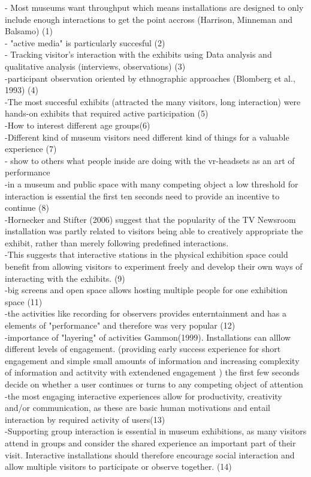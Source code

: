 \documentclass{article}
\begin{document}
- Most museums want throughput which means installations are designed to only include enough interactions to get the point accross
(Harrison, Minneman and Balsamo) (1)
\\
- "active media" is particularly succesful (2)
\\
- Tracking visitor's interaction with the exhibits using Data analysis and qualitative analysis (interviews, observations) (3)
\\
-participant observation oriented by ethnographic approaches (Blomberg et al., 1993) (4)
\\
-The most succesful exhibits (attracted the many visitors, long interaction) were hands-on exhibits that required active
participation (5)
\\
-How to interest different age groups(6)
\\
-Different kind of museum visitors need different kind of things for a valuable experience (7)
\\
- show to others what people inside are doing with the vr-headsets as an art of performance
\\
-in a museum and public space with many competing object a low threshold for interaction is essential the first ten seconds need to provide an incentive to continue (8)
\\
-Hornecker and Stifter (2006) suggest that the popularity of the TV Newsroom installation was partly related to visitors being able to creatively appropriate the exhibit, rather than merely following predefined interactions.
\\
-This suggests that interactive stations in the physical exhibition space could benefit from allowing visitors to experiment freely and develop their own ways of interacting with the exhibits. (9)
\\
-big screens and open space allows hosting multiple people for one exhibition space (11)
\\
-the activities like recording for observers provides enterntainment and has a elements of "performance" and therefore was very popular (12)
\\
-importance of "layering" of activities Gammon(1999). Installations can alllow different levels of engagement. (providing early success experience for short engagement and simple small amounts of information and increasing complexity of information and actitvity with extendened engagement )
the first few seconds decide on whether a user continues or turns to any competing object of attention
\\
-the most engaging interactive experiences allow for productivity, creativity and/or communication, as these are basic human motivations and entail interaction by required activity of users(13)
\\
-Supporting group interaction is essential in museum exhibitions, as many visitors attend in groups and consider the shared experience an important part of their visit. Interactive installations should therefore encourage social interaction and allow multiple visitors to participate or observe together. (14)
\end{document}
